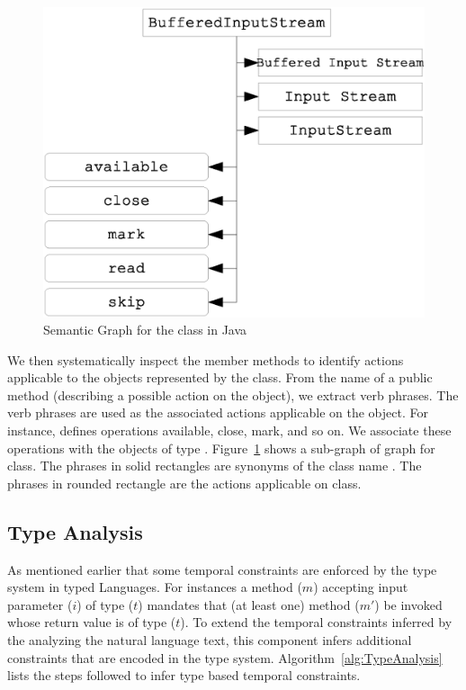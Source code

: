 \begin{figure}
	\centering
		\includegraphics[scale=0.4]{KnowledgeGraph.eps}
	\caption{Semantic Graph for the  class in Java}
	\label{fig:knowledge}
\end{figure} 


We then systematically inspect the member methods to identify actions applicable to the objects represented by the class. From the name of a public method (describing a possible action on the object), we extract verb phrases. The verb phrases are used as the associated actions applicable on the object. For instance,  defines operations available, close, mark, and so on. We associate these operations with the objects of type . Figure~\ref{fig:knowledge} shows a sub-graph of  graph for  class. The phrases in solid rectangles are synonyms of the class name . The phrases in rounded rectangle are the actions applicable on  class.
  

\subsection{Type Analysis}

As mentioned earlier that some temporal constraints are enforced by the type system in typed Languages.
For instances a method ($m$) accepting input parameter ($i$) of type ($t$) mandates that (at least one) method ($m'$) be invoked whose return value is of type ($t$). To extend the temporal constraints inferred by the analyzing the natural language text, this component infers additional constraints that are encoded
in the type system. Algorithm~\ref{alg:TypeAnalysis} lists the steps followed to infer type based temporal constraints.

